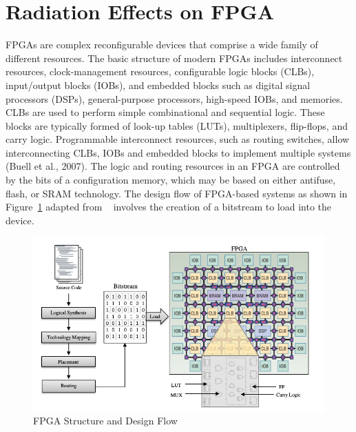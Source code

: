 \section{Radiation Effects on FPGA}

FPGAs are complex reconfigurable devices that comprise a wide family of different resources. The basic structure of modern FPGAs includes interconnect resources, clock-management resources, configurable logic blocks (CLBs), input/output
blocks (IOBs), and embedded blocks such as digital signal processors (DSPs), general-purpose processors, high-speed IOBs, and memories. CLBs are used to perform simple
combinational and sequential logic. These blocks are typically formed of look-up tables
(LUTs), multiplexers, flip-flops, and carry logic. Programmable interconnect resources, such
as routing switches, allow interconnecting CLBs, IOBs and embedded blocks to implement multiple systems (Buell et al., 2007).
The logic and routing resources in an FPGA are controlled by the bits of a configuration memory, which may be based on either antifuse, flash, or SRAM technology. The
design flow of FPGA-based systems as shown in Figure~\ref{fig:fpga-struct} adapted from ~\cite{hauck2010reconfigurable} involves the creation of a bitstream to load into the
device.



\begin{figure}[tb!]
 \centering
  \captionsetup{justification=centering}    
   \includegraphics[scale=0.4]{figures/img/FPGA-structure.png}
   \caption{FPGA Structure and Design Flow}
\label{fig:fpga-struct}
\end{figure}





